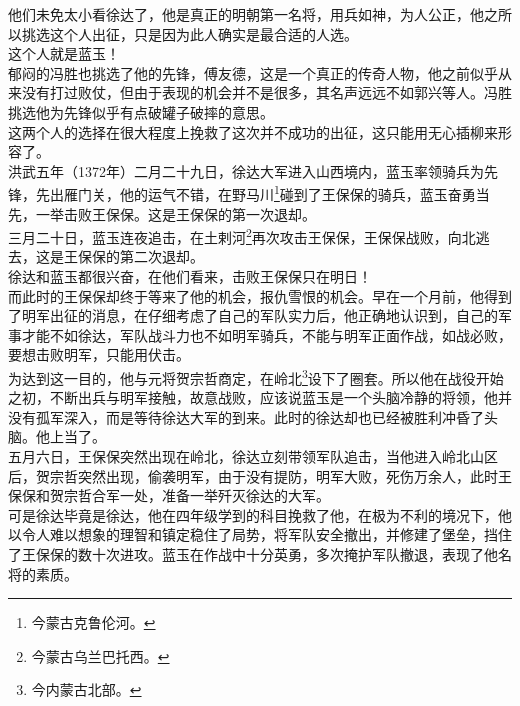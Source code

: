 \begin{multicols}{\theparacolNo}
他们未免太小看徐达了，他是真正的明朝第一名将，用兵如神，为人公正，他之所以挑选这个人出征，只是因为此人确实是最合适的人选。\\

这个人就是蓝玉！\\

郁闷的冯胜也挑选了他的先锋，傅友德，这是一个真正的传奇人物，他之前似乎从来没有打过败仗，但由于表现的机会并不是很多，其名声远远不如郭兴等人。冯胜挑选他为先锋似乎有点破罐子破摔的意思。\\

这两个人的选择在很大程度上挽救了这次并不成功的出征，这只能用无心插柳来形容了。\\

洪武五年（1372年）二月二十九日，徐达大军进入山西境内，蓝玉率领骑兵为先锋，先出雁门关，他的运气不错，在野马川\footnote{今蒙古克鲁伦河。}碰到了王保保的骑兵，蓝玉奋勇当先，一举击败王保保。这是王保保的第一次退却。\\

三月二十日，蓝玉连夜追击，在土剌河\footnote{今蒙古乌兰巴托西。}再次攻击王保保，王保保战败，向北逃去，这是王保保的第二次退却。\\

徐达和蓝玉都很兴奋，在他们看来，击败王保保只在明日！\\

而此时的王保保却终于等来了他的机会，报仇雪恨的机会。早在一个月前，他得到了明军出征的消息，在仔细考虑了自己的军队实力后，他正确地认识到，自己的军事才能不如徐达，军队战斗力也不如明军骑兵，不能与明军正面作战，如战必败，要想击败明军，只能用伏击。\\

为达到这一目的，他与元将贺宗哲商定，在岭北\footnote{今内蒙古北部。}设下了圈套。所以他在战役开始之初，不断出兵与明军接触，故意战败，应该说蓝玉是一个头脑冷静的将领，他并没有孤军深入，而是等待徐达大军的到来。此时的徐达却也已经被胜利冲昏了头脑。他上当了。\\

五月六日，王保保突然出现在岭北，徐达立刻带领军队追击，当他进入岭北山区后，贺宗哲突然出现，偷袭明军，由于没有提防，明军大败，死伤万余人，此时王保保和贺宗哲合军一处，准备一举歼灭徐达的大军。\\

可是徐达毕竟是徐达，他在四年级学到的科目挽救了他，在极为不利的境况下，他以令人难以想象的理智和镇定稳住了局势，将军队安全撤出，并修建了堡垒，挡住了王保保的数十次进攻。蓝玉在作战中十分英勇，多次掩护军队撤退，表现了他名将的素质。\\


\end{multicols}
